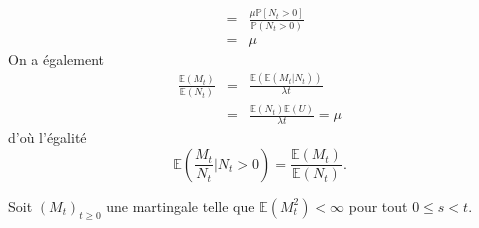 \documentclass[11pts, answers]{exam}
\newcommand*{\E}{\mathbb{E}}
\newcommand*{\F}{\mathcal{F}}
\begin{document}
\begin{questions}
\begin{parts}
\begin{solution}
\begin{eqnarray*}
&=&\frac{\mu\mathbb{P}\left[N_t>0\right]}{\mathbb{P}(N_t>0)}\\
&=&\mu
\end{eqnarray*}
On a également
\begin{eqnarray*} 
\frac{\mathbb{E}(M_t)}{\mathbb{E}(N_t)}&=& \frac{\mathbb{E}(\mathbb{E}(M_t|N_t))}{\lambda t}\\
&=& \frac{\mathbb{E}(N_t)\mathbb{E}(U)}{\lambda t} = \mu
\end{eqnarray*}
d'où l'égalité 
$$
\mathbb{E}\left(\frac{M_t}{N_t}\Big\rvert N_t>0\right) = \frac{\mathbb{E}(M_t)}{\mathbb{E}(N_t)}.
$$
\end{solution}
\end{parts}
\question Soit $(M_t)_{t\geq 0}$ une martingale telle que $\E(M_t^2)<\infty$ pour tout $0\leq s< t$.
\end{questions}
\end{document}
